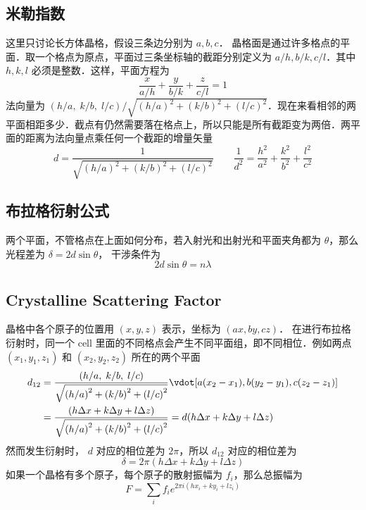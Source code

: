 
\subsection{米勒指数}

这里只讨论长方体晶格，假设三条边分别为 $a,b,c$．  晶格面是通过许多格点的平面．取一个格点为原点，平面过三条坐标轴的截距分别定义为 $a/h, b/k, c/l$．其中 $h,k,l$ 必须是整数．这样，平面方程为
\begin{equation}
\frac{x}{{a/h}} + \frac{y}{{b/k}} + \frac{z}{{c/l}} = 1
\end{equation}
法向量为 $(h/a,\;k/b,\;l/c)/\sqrt {{{(h/a)}^2} + {{(k/b)}^2} + {{(l/c)}^2}}$．现在来看相邻的两平面相距多少．截点有仍然需要落在格点上，所以只能是所有截距变为两倍．两平面的距离为法向量点乘任何一个截距的增量矢量
\begin{equation}
d = \frac{1}{{\sqrt {{{(h/a)}^2} + {{(k/b)}^2} + {{(l/c)}^2}} }}
\qquad
\frac{1}{{{d^2}}} = \frac{{{h^2}}}{{{a^2}}} + \frac{{{k^2}}}{{{b^2}}} + \frac{{{l^2}}}{{{c^2}}}
\end{equation}

\subsection{布拉格衍射公式}

两个平面，不管格点在上面如何分布，若入射光和出射光和平面夹角都为 $\theta$，那么光程差为 $\delta  = 2d\sin \theta$， 干涉条件为
\begin{equation}
2d\sin \theta  = n\lambda
\end{equation}

\subsection{Crystalline Scattering Factor}

晶格中各个原子的位置用 $(x,y,z)$ 表示，坐标为 $(ax,by,cz)$． 在进行布拉格衍射时，同一个 cell 里面的不同格点会产生不同平面组，即不同相位．例如两点 $({x_1},{y_1},{z_1})$ 和 $({x_2},{y_2},{z_2})$ 所在的两个平面
\begin{equation}
\begin{aligned}
{d_{12}} &= \frac{{(h/a,\;k/b,\;l/c)}}{{\sqrt {{{(h/a)}^2} + {{(k/b)}^2} + {{(l/c)}^2}} }} \vdot [a({x_2} - {x_1}),b({y_2} - {y_1}),c({z_2} - {z_1})] \\
&= \frac{{(h\Delta x + k\Delta y + l\Delta z)}}{{\sqrt {{{(h/a)}^2} + {{(k/b)}^2} + {{(l/c)}^2}} }} = d(h\Delta x + k\Delta y + l\Delta z)
\end{aligned}
\end{equation}
然而发生衍射时， $d$ 对应的相位差为 $2\pi$，所以 $d_{12}$ 对应的相位差为
\begin{equation}
\delta  = 2\pi (h\Delta x + k\Delta y + l\Delta z)
\end{equation}
如果一个晶格有多个原子，每个原子的散射振幅为 ${f_i}$，那么总振幅为
\begin{equation}
F = \sum\limits_i {{f_i}{e^{2\pi i(h{x_i} + k{y_i} + l{z_i})}}} 
\end{equation}


 




